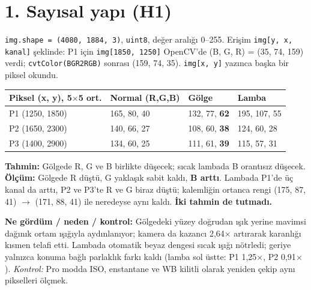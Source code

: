 \documentclass[9pt,a4paper]{extarticle}
\newcommand{\anah}[1]{\textbf{#1}}                        %
\newcommand{\kotu}[1]{\textcolor{kirmizi}{\textbf{#1}}}   %
\newcommand{\kod}[1]{\texttt{\small #1}}
\newcommand{\kucuk}{\fontsize{8}{9.5}\selectfont}
\newenvironment{sutun}[1]{\begin{minipage}[t]{#1}\setlength{\parskip}{0.5ex}}{\end{minipage}}
\begin{document}
\noindent
\begin{sutun}{0.465\linewidth}
\section*{1. Sayısal yapı (H1)}
\kod{img.shape = (4080, 1884, 3)}, \kod{uint8}, değer aralığı 0--255. Erişim \kod{img[y, x, kanal]} şeklinde: P1 için \kod{img[1850, 1250]} OpenCV'de (B, G, R) = (35, 74, 159) verdi; \kod{cvtColor(BGR2RGB)} sonrası (159, 74, 35). \kod{img[x, y]} yazınca başka bir piksel okundu.

{\kucuk
\begin{tabularx}{\linewidth}{@{}Ylll@{}}
\toprule
\textbf{Piksel (x, y), 5$\times$5 ort.} & \textbf{Normal (R,G,B)} & \textbf{Gölge} & \textbf{Lamba} \\
\midrule
P1 (1250, 1850) & 165, 80, 40 & 132, 77, \textbf{62} & 195, 107, 55 \\
P2 (1650, 2300) & 140, 66, 27 & 108, 60, \textbf{38} & 124, 60, 28 \\
P3 (1400, 2900) & 134, 60, 25 & 111, 61, \textbf{39} & 115, 57, 31 \\
\bottomrule
\end{tabularx}\par}

\anah{Tahmin:} Gölgede R, G ve B birlikte düşecek; sıcak lambada B orantısız düşecek.
\anah{Ölçüm:} Gölgede R düştü, G yaklaşık sabit kaldı, \textbf{B arttı}. Lambada P1'de üç kanal da arttı, P2 ve P3'te R ve G biraz düştü; kalemliğin ortanca rengi (175, 87, 41) $\rightarrow$ (171, 88, 41) ile neredeyse aynı kaldı. \kotu{İki tahmin de tutmadı.}

\anah{Ne gördüm / neden / kontrol:} Gölgedeki yüzey doğrudan ışık yerine mavimsi dağınık ortam ışığıyla aydınlanıyor; kamera da kazancı 2,64$\times$ artırarak karanlığı kısmen telafi etti. Lambada otomatik beyaz dengesi sıcak ışığı nötrledi; geriye yalnızca konuma bağlı parlaklık farkı kaldı (lamba sol üstte: P1 1,25$\times$, P2 0,91$\times$).
\textit{Kontrol:} Pro modda ISO, enstantane ve WB kilitli olarak yeniden çekip aynı pikselleri ölçmek.
\end{sutun}\hfill
\end{document}
